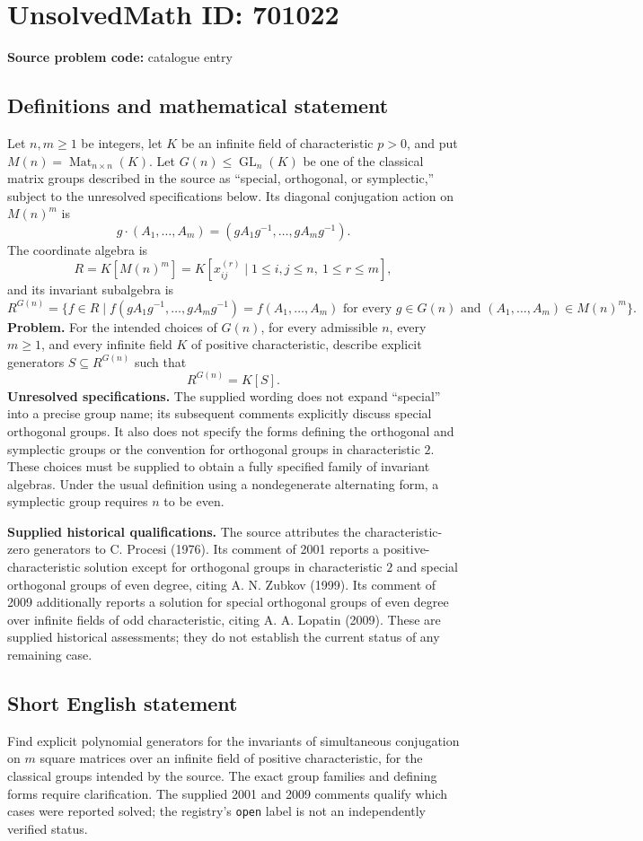 \documentclass[11pt]{article}
\begin{document}
\section*{UnsolvedMath ID: 701022}
\textbf{Source problem code:} catalogue entry
\subsection{Definitions and mathematical statement}
Let \(n,m\geq 1\) be integers, let \(K\) be an infinite field of characteristic \(p>0\), and put \(M(n)=\operatorname{Mat}_{n\times n}(K)\). Let \(G(n)\leq\operatorname{GL}_n(K)\) be one of the classical matrix groups described in the source as ``special, orthogonal, or symplectic,'' subject to the unresolved specifications below. Its diagonal conjugation action on \(M(n)^m\) is
\[
g\cdot(A_1,\ldots,A_m)=(gA_1g^{-1},\ldots,gA_mg^{-1}).
\]
The coordinate algebra is
\[
R=K[M(n)^m]=K[x_{ij}^{(r)}\mid 1\leq i,j\leq n,\ 1\leq r\leq m],
\]
and its invariant subalgebra is
\[
R^{G(n)}=\{f\in R\mid f(gA_1g^{-1},\ldots,gA_mg^{-1})=f(A_1,\ldots,A_m)\text{ for every }g\in G(n)\text{ and }(A_1,\ldots,A_m)\in M(n)^m\}.
\]
\textbf{Problem.} For the intended choices of \(G(n)\), for every admissible \(n\), every \(m\geq1\), and every infinite field \(K\) of positive characteristic, describe explicit generators \(S\subseteq R^{G(n)}\) such that
\[
R^{G(n)}=K[S].
\]
\textbf{Unresolved specifications.} The supplied wording does not expand ``special'' into a precise group name; its subsequent comments explicitly discuss special orthogonal groups. It also does not specify the forms defining the orthogonal and symplectic groups or the convention for orthogonal groups in characteristic \(2\). These choices must be supplied to obtain a fully specified family of invariant algebras. Under the usual definition using a nondegenerate alternating form, a symplectic group requires \(n\) to be even.

\textbf{Supplied historical qualifications.} The source attributes the characteristic-zero generators to C. Procesi (1976). Its comment of 2001 reports a positive-characteristic solution except for orthogonal groups in characteristic \(2\) and special orthogonal groups of even degree, citing A. N. Zubkov (1999). Its comment of 2009 additionally reports a solution for special orthogonal groups of even degree over infinite fields of odd characteristic, citing A. A. Lopatin (2009). These are supplied historical assessments; they do not establish the current status of any remaining case.
\subsection{Short English statement}
Find explicit polynomial generators for the invariants of simultaneous conjugation on \(m\) square matrices over an infinite field of positive characteristic, for the classical groups intended by the source. The exact group families and defining forms require clarification. The supplied 2001 and 2009 comments qualify which cases were reported solved; the registry's \texttt{open} label is not an independently verified status.
\end{document}
